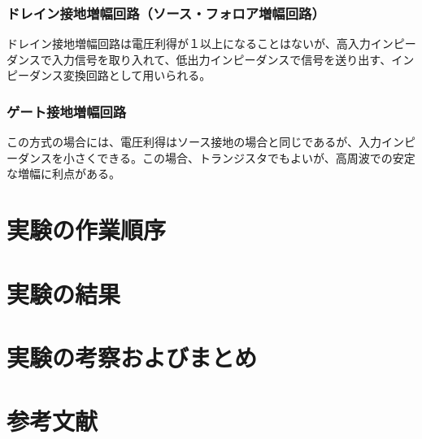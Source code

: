 \documentclass[a4paper,11pt,xelatex,ja=standard]{bxjsarticle}
\begin{document}
        \subsubsection{ドレイン接地増幅回路（ソース・フォロア増幅回路）}
            ドレイン接地増幅回路は電圧利得が１以上になることはないが、高入力インピーダンスで入力信号を取り入れて、低出力インピーダンスで信号を送り出す、インピーダンス変換回路として用いられる。
        \subsubsection{ゲート接地増幅回路}
            この方式の場合には、電圧利得はソース接地の場合と同じであるが、入力インピーダンスを小さくできる。この場合、トランジスタでもよいが、高周波での安定な増幅に利点がある。
    
\section{実験の作業順序}
\section{実験の結果}
\section{実験の考察およびまとめ}
\section{参考文献}
\end{document}
